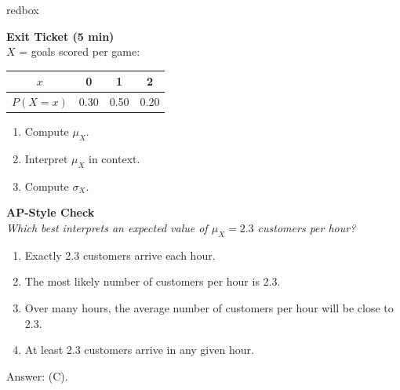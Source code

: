\documentclass[10pt]{article}
\begin{document}
\begin{skillbox}{redbox}
\begin{minipage}[t]{0.48\linewidth}
    \textbf{Exit Ticket (5 min)}\\
    $X$ = goals scored per game:
    \begin{center}
    \small\renewcommand{\arraystretch}{1.3}
    \begin{tabular}{@{}cccc@{}}
    $x$ & 0 & 1 & 2 \\
    \hline
    $P(X=x)$ & 0.30 & 0.50 & 0.20 \\
    \end{tabular}
    \end{center}
    \begin{enumerate}
        \item Compute $\mu_X$.
        \item Interpret $\mu_X$ in context.
        \item Compute $\sigma_X$.
    \end{enumerate}
\end{minipage}
\hfill
\begin{minipage}[t]{0.48\linewidth}
    \textbf{AP-Style Check}\\
    \textit{Which best interprets an expected value of $\mu_X = 2.3$ customers
    per hour?}
    \begin{enumerate}[label=(\Alph*)]
        \item Exactly 2.3 customers arrive each hour.
        \item The most likely number of customers per hour is 2.3.
        \item Over many hours, the average number of customers per hour will be
              close to 2.3.
        \item At least 2.3 customers arrive in any given hour.
    \end{enumerate}
    Answer: (C).
\end{minipage}
\end{skillbox}
\end{document}
